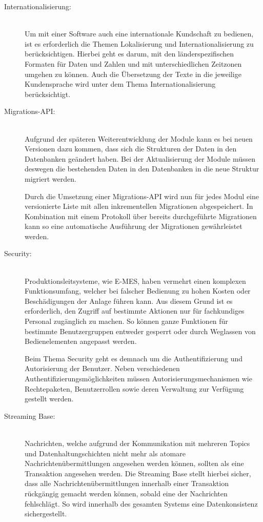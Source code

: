 \begin{description}
    \item[Internationalisierung:]\hfill \\
    Um mit einer Software auch eine internationale Kundschaft zu bedienen, ist es erforderlich die Themen Lokalisierung und Internationalisierung zu berücksichtigen. Hierbei geht es darum, mit den länderspezifischen Formaten für Daten und Zahlen und mit unterschiedlichen Zeitzonen umgehen zu können. Auch die Übersetzung der Texte in die jeweilige Kundensprache wird unter dem Thema Internationalisierung berücksichtigt.
    
    \item[Migrations-API:]\hfill \\
    Aufgrund der späteren Weiterentwicklung der Module kann es bei neuen Versionen dazu kommen, dass sich die Strukturen der Daten in den Datenbanken geändert haben. Bei der Aktualisierung der Module müssen deswegen die bestehenden Daten in den Datenbanken in die neue Struktur migriert werden.

    Durch die Umsetzung einer Migrations-API wird nun für jedes Modul eine versionierte Liste mit allen inkrementellen Migrationen abgespeichert. In Kombination mit einem Protokoll über bereits durchgeführte Migrationen kann so eine automatische Ausführung der Migrationen gewährleistet werden.

    \item[Security:]\hfill \\
    Produktionsleitsysteme, wie \glqq E-MES\grqq{}, haben vermehrt einen komplexen Funktionsumfang, welcher bei falscher Bedienung zu hohen Kosten oder Beschädigungen der Anlage führen kann. Aus diesem Grund ist es erforderlich, den Zugriff auf bestimmte Aktionen nur für fachkundiges Personal zugänglich zu machen. So können ganze Funktionen für bestimmte Benutzergruppen entweder gesperrt oder durch Weglassen von Bedienelementen angepasst werden.

    Beim Thema \glqq Security\grqq{} geht es demnach um die Authentifizierung und Autorisierung der Benutzer. Neben verschiedenen Authentifizierungsmöglichkeiten müssen Autorisierungsmechanismen wie Rechtepaketen, Benutzerrollen sowie deren Verwaltung zur Verfügung gestellt werden.

    \item[Streaming Base:]\hfill \\
    Nachrichten, welche aufgrund der Kommunikation mit mehreren Topics und Datenhaltungschichten nicht mehr als atomare Nachrichtenübermittlungen angesehen werden können, sollten als eine Transaktion angesehen werden. Die Streaming Base stellt hierbei sicher, dass alle Nachrichtenübermittlungen innerhalb einer Transaktion rückgängig gemacht werden können, sobald eine der Nachrichten fehlschlägt. So wird innerhalb des gesamten Systems eine Datenkonsistenz sichergestellt.


\end{description}
